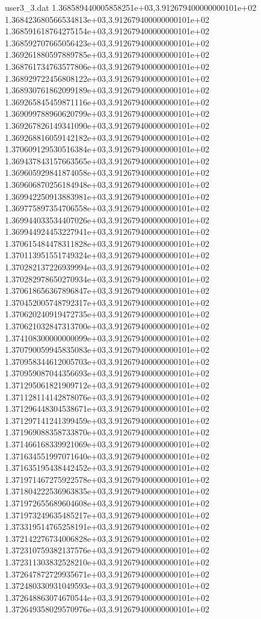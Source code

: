 \begin{filecontents}{user3_3.dat}
1.368589440005858251e+03,3.912679400000000101e+02
1.368423680566534813e+03,3.912679400000000101e+02
1.368591618764275154e+03,3.912679400000000101e+02
1.368592707665056423e+03,3.912679400000000101e+02
1.369261880597889785e+03,3.912679400000000101e+02
1.368761734763577806e+03,3.912679400000000101e+02
1.368929722456808122e+03,3.912679400000000101e+02
1.368930761862099189e+03,3.912679400000000101e+02
1.369265845459871116e+03,3.912679400000000101e+02
1.369099788960620799e+03,3.912679400000000101e+02
1.369267826149341090e+03,3.912679400000000101e+02
1.369268816059142182e+03,3.912679400000000101e+02
1.370609129530516384e+03,3.912679400000000101e+02
1.369437843157663565e+03,3.912679400000000101e+02
1.369605929841874058e+03,3.912679400000000101e+02
1.369606870256184948e+03,3.912679400000000101e+02
1.369942250913883981e+03,3.912679400000000101e+02
1.369775897354706558e+03,3.912679400000000101e+02
1.369944033534407026e+03,3.912679400000000101e+02
1.369944924453227941e+03,3.912679400000000101e+02
1.370615484478311828e+03,3.912679400000000101e+02
1.370113951551749324e+03,3.912679400000000101e+02
1.370282137226939994e+03,3.912679400000000101e+02
1.370282978650270934e+03,3.912679400000000101e+02
1.370618656367896847e+03,3.912679400000000101e+02
1.370452005748792317e+03,3.912679400000000101e+02
1.370620240919472735e+03,3.912679400000000101e+02
1.370621032847313700e+03,3.912679400000000101e+02
1.374108300000000099e+03,3.912679400000000101e+02
1.370790059945835083e+03,3.912679400000000101e+02
1.370958344612005703e+03,3.912679400000000101e+02
1.370959087044356693e+03,3.912679400000000101e+02
1.371295061821909712e+03,3.912679400000000101e+02
1.371128114142878076e+03,3.912679400000000101e+02
1.371296448304538671e+03,3.912679400000000101e+02
1.371297141241399459e+03,3.912679400000000101e+02
1.371969088358733870e+03,3.912679400000000101e+02
1.371466168339921069e+03,3.912679400000000101e+02
1.371634551997071640e+03,3.912679400000000101e+02
1.371635195438442452e+03,3.912679400000000101e+02
1.371971467275922578e+03,3.912679400000000101e+02
1.371804222536963835e+03,3.912679400000000101e+02
1.371972655689604608e+03,3.912679400000000101e+02
1.371973249635485217e+03,3.912679400000000101e+02
1.373319514765258191e+03,3.912679400000000101e+02
1.372142276734006828e+03,3.912679400000000101e+02
1.372310759382137576e+03,3.912679400000000101e+02
1.372311303832528210e+03,3.912679400000000101e+02
1.372647872729935671e+03,3.912679400000000101e+02
1.372480330931049593e+03,3.912679400000000101e+02
1.372648863074670544e+03,3.912679400000000101e+02
1.372649358029570976e+03,3.912679400000000101e+02

\end{filecontents}
